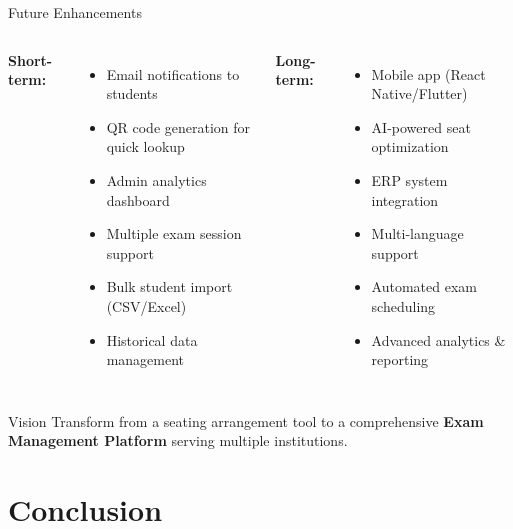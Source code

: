 \documentclass[aspectratio=169]{beamer}
\begin{document}
\begin{frame}{Future Enhancements}
\begin{columns}
\textbf{Short-term:}
\begin{itemize}
    \item Email notifications to students
    \item QR code generation for quick lookup
    \item Admin analytics dashboard
    \item Multiple exam session support
    \item Bulk student import (CSV/Excel)
    \item Historical data management
\end{itemize}

\textbf{Long-term:}
\begin{itemize}
    \item Mobile app (React Native/Flutter)
    \item AI-powered seat optimization
    \item ERP system integration
    \item Multi-language support
    \item Automated exam scheduling
    \item Advanced analytics \& reporting
\end{itemize}
\end{columns}

\vspace{0.5cm}
\begin{block}{Vision}
Transform from a seating arrangement tool to a comprehensive \textbf{Exam Management Platform} serving multiple institutions.
\end{block}
\end{frame}

\section{Conclusion}
\end{document}
